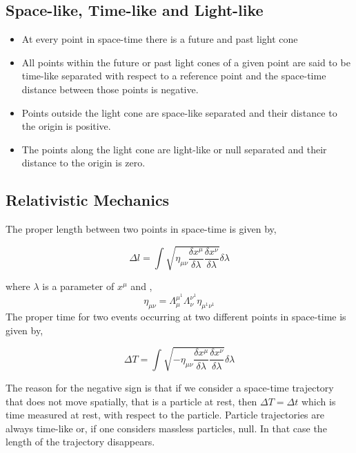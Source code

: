 \subsection{Space-like, Time-like and Light-like}
\begin{tcolorbox}
\begin{itemize}
    \item At every point in space-time there is a future and past light cone 
    \item All points within the future or past light cones of a given point are said to be time-like separated with respect to a reference point and the space-time distance between those points is negative.
    \item Points outside the light cone are space-like separated and their distance to the origin is positive. 
    \item The points along the light cone are light-like or null separated and their distance to the origin is zero. 
\end{itemize}
 \end{tcolorbox}
 \subsection{Relativistic Mechanics}
 The proper length between two points in space-time is given by, 
 \begin{tcolorbox}
 \begin{equation}
    \Delta l = \int \sqrt{\eta_{{\mu}{\nu}} \frac{\delta x^{\mu}}{\delta \lambda} \frac{\delta x^{\nu}}{\delta \lambda} }\delta \lambda
 \end{equation}
 \end{tcolorbox}
 where $\lambda$ is a parameter of $x^{\mu}$ and ,
 \begin{equation*}
     \eta _{{\mu}{\nu}} = \Lambda_{\mu}^{\mu^{1}} \Lambda_{\nu}^{\nu^{1}} \eta _{{\mu^{1}}{\nu}^{1}}
 \end{equation*}
 The proper time for two events occurring at two different points in space-time is given by, 
 \begin{tcolorbox}
 \begin{equation}
  \Delta T = \int \sqrt{-\eta_{{\mu}{\nu}} \frac{\delta x^{\mu}}{\delta \lambda} \frac{\delta x^{\nu}}{\delta \lambda} }\delta \lambda
  \end{equation}
 \end{tcolorbox}
 The reason for the negative sign is that if we consider a space-time trajectory that does not move spatially, that is a particle at rest, then $\Delta T = \Delta t$ which is time measured at rest, with respect to the particle. Particle trajectories are always time-like or, if one considers massless particles, null. In that case the length of the trajectory disappears.
